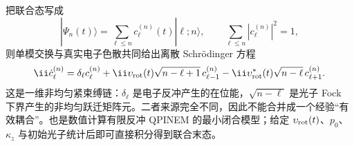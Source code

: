 把联合态写成
\begin{equation*}
 |\Psi_n(t)\rangle=\sum_{\ell\le n}c_\ell^{(n)}(t)|\ell;n\rangle,
 \qquad
 \sum_{\ell\le n}|c_\ell^{(n)}|^2=1,
\end{equation*}
则单模交换与真实电子色散共同给出离散 Schr\"odinger 方程
\begin{equation}
{
 \ii\dot c_\ell^{(n)}
 =\delta_\ell c_\ell^{(n)}
 +\ii\upsilon_{\rm rot}(t)\sqrt{n-\ell+1}\,c_{\ell-1}^{(n)}
 -\ii\upsilon_{\rm rot}^*(t)\sqrt{n-\ell}\,c_{\ell+1}^{(n)}.}
\label{eq:qpinem_finite_recoil_coupled_lattice_dp46}
\end{equation}
这是一维非均匀紧束缚链：$\delta_\ell$ 是电子反冲产生的在位能，$\sqrt{n-\ell}$ 是光子 Fock 下界产生的非均匀跃迁矩阵元。二者来源完全不同，因此不能合并成一个经验“有效耦合”。也是数值计算有限反冲 QPINEM 的最小闭合模型；给定 $\upsilon_{\rm rot}(t)$、$p_0$、$\kappa_z$ 与初始光子统计后即可直接积分得到联合末态。

